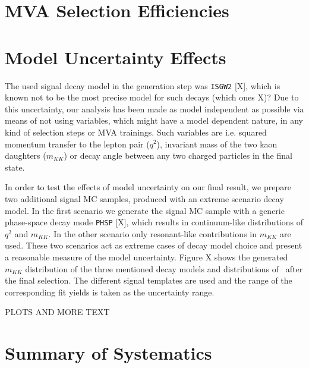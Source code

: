 \section{MVA Selection Efficiencies}


\section{Model Uncertainty Effects}
The used signal decay model in the generation step was \texttt{ISGW2} [X], which is known not to be the most precise model for such decays (which ones X)? Due to this uncertainty, our analysis has been made as model independent as possible via means of not using variables, which might have a model dependent nature, in any kind of selection steps or MVA trainings. Such variables are i.e. squared momentum transfer to the lepton pair ($q^2$), invariant mass of the two kaon daughters ($m_{KK}$) or decay angle between any two charged particles in the final state.

In order to test the effects of model uncertainty on our final result, we prepare two additional signal MC samples, produced with an extreme scenario decay model. In the first scenario we generate the signal MC sample with a generic phase-space decay mode \texttt{PHSP} [X], which results in continuum-like distributions of $q^2$ and $m_{KK}$. In the other scenario only resonant-like contributions in $m_{KK}$ are used. These two scenarios act as extreme cases of decay model choice and present a reasonable measure of the model uncertainty. Figure X shows the generated $m_{KK}$ distribution of the three mentioned decay models and distributions of \vars~after the final selection. The different signal templates are used and the range of the corresponding fit yields is taken as the uncertainty range.

PLOTS AND MORE TEXT

\section{Summary of Systematics}





